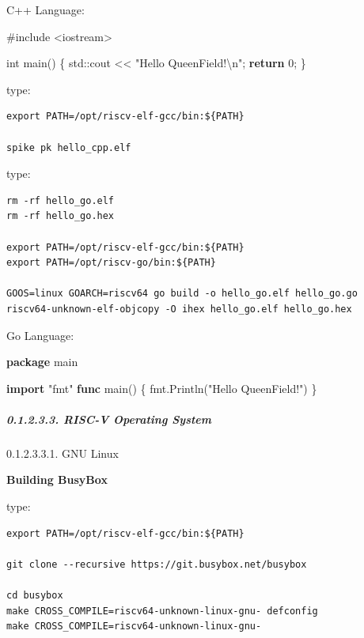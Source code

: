 \documentclass[
]{article}
\newenvironment{Shaded}{}{}
\newcommand{\BuiltInTok}[1]{#1}
\newcommand{\ControlFlowTok}[1]{\textcolor[rgb]{0.00,0.44,0.13}{\textbf{#1}}}
\newcommand{\DataTypeTok}[1]{\textcolor[rgb]{0.56,0.13,0.00}{#1}}
\newcommand{\DecValTok}[1]{\textcolor[rgb]{0.25,0.63,0.44}{#1}}
\newcommand{\ImportTok}[1]{#1}
\newcommand{\KeywordTok}[1]{\textcolor[rgb]{0.00,0.44,0.13}{\textbf{#1}}}
\newcommand{\NormalTok}[1]{#1}
\newcommand{\PreprocessorTok}[1]{\textcolor[rgb]{0.74,0.48,0.00}{#1}}
\newcommand{\SpecialCharTok}[1]{\textcolor[rgb]{0.25,0.44,0.63}{#1}}
\newcommand{\StringTok}[1]{\textcolor[rgb]{0.25,0.44,0.63}{#1}}
\begin{document}
C++ Language:

\begin{Shaded}
\begin{Highlighting}[]
\PreprocessorTok{\#include }\ImportTok{\textless{}iostream\textgreater{}}

\DataTypeTok{int}\NormalTok{ main() \{}
  \BuiltInTok{std::}\NormalTok{cout \textless{}\textless{} }\StringTok{"Hello QueenField!}\SpecialCharTok{\textbackslash{}n}\StringTok{"}\NormalTok{;}
  \ControlFlowTok{return} \DecValTok{0}\NormalTok{;}
\NormalTok{\}}
\end{Highlighting}
\end{Shaded}

type:

\begin{verbatim}
export PATH=/opt/riscv-elf-gcc/bin:${PATH}

spike pk hello_cpp.elf
\end{verbatim}

type:

\begin{verbatim}
rm -rf hello_go.elf
rm -rf hello_go.hex

export PATH=/opt/riscv-elf-gcc/bin:${PATH}
export PATH=/opt/riscv-go/bin:${PATH}

GOOS=linux GOARCH=riscv64 go build -o hello_go.elf hello_go.go
riscv64-unknown-elf-objcopy -O ihex hello_go.elf hello_go.hex
\end{verbatim}

Go Language:

\begin{Shaded}
\begin{Highlighting}[]
\KeywordTok{package}\NormalTok{ main}

\KeywordTok{import} \StringTok{"fmt"}
\KeywordTok{func}\NormalTok{ main() \{}
\NormalTok{  fmt.Println(}\StringTok{"Hello QueenField!"}\NormalTok{)}
\NormalTok{\}}
\end{Highlighting}
\end{Shaded}

\hypertarget{risc-v-operating-system}{%
\subparagraph{0.1.2.3.3. RISC-V Operating
System}\label{risc-v-operating-system}}

0.1.2.3.3.1. GNU Linux

\textbf{Building BusyBox}

type:

\begin{verbatim}
export PATH=/opt/riscv-elf-gcc/bin:${PATH}

git clone --recursive https://git.busybox.net/busybox

cd busybox
make CROSS_COMPILE=riscv64-unknown-linux-gnu- defconfig
make CROSS_COMPILE=riscv64-unknown-linux-gnu-
\end{verbatim}
\end{document}
